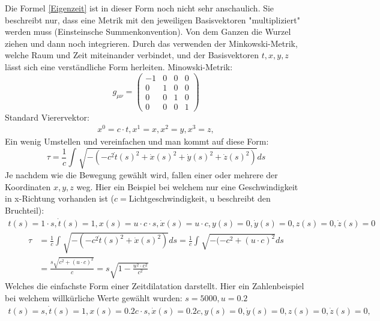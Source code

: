 \begin{refsection}
Die Formel \ref{Eigenzeit} ist in dieser Form noch nicht sehr anschaulich. Sie beschreibt nur, dass eine Metrik mit den jeweiligen Basisvektoren "multipliziert" werden muss (Einsteinsche Summenkonvention). Von dem Ganzen die Wurzel ziehen und dann noch integrieren.
Durch das verwenden der Minkowski-Metrik, welche Raum und Zeit miteinander verbindet, und der Basisvektoren $t, x, y, z$ l\"asst sich eine verst\"andliche Form herleiten. 
Minowski-Metrik:
\begin{equation}
    g_{\mu\nu}=
    \begin{pmatrix}
        -1 & 0 & 0 & 0 \\
        0 & 1 & 0 & 0 \\
        0 & 0 & 1 & 0 \\
        0 & 0 & 0 & 1
    \end{pmatrix}
\end{equation}
Standard Vierervektor:
\begin{align*}
    x^{0}=c \cdot t,
    x^{1}=x,
    x^{2}=y,
    x^{3}=z,
\end{align*}
Ein wenig Umstellen und vereinfachen und man kommt auf diese Form:
\begin{equation}
    \tau
    =
    \frac{1}{c}\int_{}^{}\sqrt{-(-c^2\dot{t}(s)^{2}+\dot{x}(s)^{2}+\dot{y}(s)^{2}+\dot{z}(s)^{2})}ds
\end{equation}
Je nachdem wie die Bewegung gew\"ahlt wird, fallen einer oder mehrere der Koordinaten $x, y, z$ weg.
Hier ein Beispiel bei welchem nur eine Geschwindigkeit in x-Richtung vorhanden ist ($c=$Lichtgeschwindigkeit, u beschreibt den Bruchteil):
\begin{align*}
     t(s)=1\cdot s, \dot{t}(s)=1,
 	 x(s)=u\cdot c \cdot s, \dot{x}(s)=u\cdot c,
     y(s)=0, \dot{y}(s)=0,
     z(s)=0, \dot{z}(s)=0
\end{align*}
\begin{align*}
    \tau
    &=
    \frac{1}{c}\int_{}^{}\sqrt{-(-c^2\dot{t}(s)^2+\dot{x}(s)^2)}ds 
    =
    \frac{1}{c}\int_{}^{}\sqrt{-(-c^2 +(u\cdot c)^{2}}ds\\
    &=
    \frac{s\sqrt{c^2+(u\cdot c)^{2}}}{c} 
    =
    s\sqrt{1-\frac{u^2\cdot c^2}{c^2}}
\end{align*}
Welches die einfachste Form einer Zeitdilatation darstellt.
Hier ein Zahlenbeispiel bei welchem willkürliche Werte gew\"ahlt wurden:
$s=5000, u=0.2$ 
\begin{align*}
    t(s)=s, \dot{t}(s)=1,
    x(s)=0.2c \cdot s, \dot{x}(s)=0.2c,
    y(s)=0, \dot{y}(s)=0,
    z(s)=0, \dot{z}(s)=0,

\end{align*}
\end{refsection}
